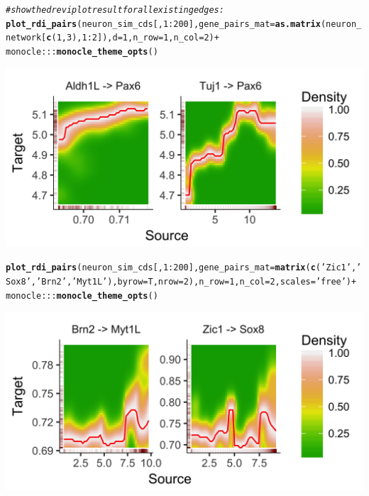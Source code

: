 \documentclass[10pt,oneside]{article}\usepackage[]{graphicx}\usepackage[]{color}
\makeatletter
\def\maxwidth{ %
  \ifdim\Gin@nat@width>\linewidth
    \linewidth
  \else
    \Gin@nat@width
  \fi
}
\newcommand{\hlnum}[1]{\textcolor[rgb]{0.686,0.059,0.569}{#1}}%
\newcommand{\hlstr}[1]{\textcolor[rgb]{0.192,0.494,0.8}{#1}}%
\newcommand{\hlcom}[1]{\textcolor[rgb]{0.678,0.584,0.686}{\textit{#1}}}%
\newcommand{\hlopt}[1]{\textcolor[rgb]{0,0,0}{#1}}%
\newcommand{\hlstd}[1]{\textcolor[rgb]{0.345,0.345,0.345}{#1}}%
\newcommand{\hlkwc}[1]{\textcolor[rgb]{0.333,0.667,0.333}{#1}}%
\newcommand{\hlkwd}[1]{\textcolor[rgb]{0.737,0.353,0.396}{\textbf{#1}}}%
\newenvironment{kframe}{%
 \def\at@end@of@kframe{}%
 \ifinner\ifhmode%
  \def\at@end@of@kframe{\end{minipage}}%
  \begin{minipage}{\columnwidth}%
 \fi\fi%
 \def\FrameCommand##1{\hskip\@totalleftmargin \hskip-\fboxsep
 \colorbox{shadecolor}{##1}\hskip-\fboxsep
     \hskip-\linewidth \hskip-\@totalleftmargin \hskip\columnwidth}%
 \MakeFramed {\advance\hsize-\width
   \@totalleftmargin\z@ \linewidth\hsize
   \@setminipage}}%
 {\par\unskip\endMakeFramed%
 \at@end@of@kframe}
\newenvironment{knitrout}{}{} %
\makeatother
\begin{document}
\begin{knitrout}
\color{fgcolor}\begin{kframe}
\begin{alltt}
\hlcom{# show the drevi plot result for all existing edges:}
\hlkwd{plot_rdi_pairs}\hlstd{(neuron_sim_cds[,} \hlnum{1}\hlopt{:}\hlnum{200}\hlstd{],} \hlkwc{gene_pairs_mat} \hlstd{=} \hlkwd{as.matrix}\hlstd{(neuron_network[}\hlkwd{c}\hlstd{(}\hlnum{1}\hlstd{,} \hlnum{3}\hlstd{),} \hlnum{1}\hlopt{:}\hlnum{2}\hlstd{]),} \hlkwc{d} \hlstd{=} \hlnum{1}\hlstd{,} \hlkwc{n_row} \hlstd{=} \hlnum{1}\hlstd{,} \hlkwc{n_col} \hlstd{=} \hlnum{2}\hlstd{)} \hlopt{+}
  \hlstd{monocle}\hlopt{:::}\hlkwd{monocle_theme_opts}\hlstd{()}
\end{alltt}
\end{kframe}

{\centering \includegraphics[width=\maxwidth]{figure/plot_drevi-1} 

}


\begin{kframe}\begin{alltt}
\hlkwd{plot_rdi_pairs}\hlstd{(neuron_sim_cds[,} \hlnum{1}\hlopt{:}\hlnum{200}\hlstd{],} \hlkwc{gene_pairs_mat} \hlstd{=} \hlkwd{matrix}\hlstd{(}\hlkwd{c}\hlstd{(}\hlstr{'Zic1'}\hlstd{,} \hlstr{'Sox8'}\hlstd{,} \hlstr{'Brn2'}\hlstd{,} \hlstr{'Myt1L'}\hlstd{),} \hlkwc{byrow} \hlstd{= T,} \hlkwc{nrow} \hlstd{=} \hlnum{2}\hlstd{),} \hlkwc{n_row} \hlstd{=} \hlnum{1}\hlstd{,} \hlkwc{n_col} \hlstd{=} \hlnum{2}\hlstd{,} \hlkwc{scales} \hlstd{=} \hlstr{'free'}\hlstd{)} \hlopt{+}
  \hlstd{monocle}\hlopt{:::}\hlkwd{monocle_theme_opts}\hlstd{()}
\end{alltt}
\end{kframe}

{\centering \includegraphics[width=\maxwidth]{figure/plot_drevi-2} 

}
\end{knitrout}
\end{document}
